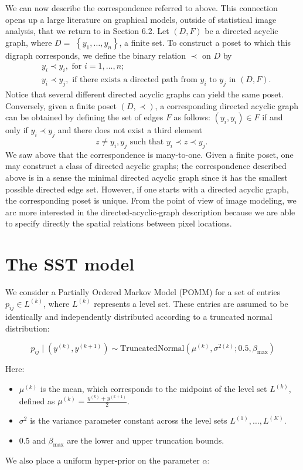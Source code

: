 \documentclass[11pt]{amsart}
\begin{document}
We can now describe the correspondence referred to above. This connection opens up a large literature on graphical models, outside of statistical image analysis, that we return to in Section 6.2. Let $(D, F)$ be a directed acyclic graph, where $D=$ $\left\{y_1, \ldots, y_n\right\}$, a finite set. To construct a poset to which this digraph corresponds, we define the binary relation $\prec$ on $D$ by
$$
\begin{aligned}
& y_i \prec y_i, \text { for } i=1, \ldots, n \text {; } \\
& y_i \prec y_j, \text { if there exists a directed path from } y_i \text { to } y_j \text { in }(D, F) .
\end{aligned}
$$
Notice that several different directed acyclic graphs can yield the same poset.
Conversely, given a finite poset $(D, \prec)$, a corresponding directed acyclic graph can be obtained by defining the set of edges $F$ as follows:
$\left(y_i, y_i\right) \in F$ if and only if $y_i \prec y_j$ and there does not exist a third element
$$
z \neq y_i, y_j \text { such that } y_i \prec z \prec y_j \text {. }
$$
We saw above that the correspondence is many-to-one. Given a finite poset, one may construct a class of directed acyclic graphs; the correspondence described above is in a sense the minimal directed acyclic graph since it has the smallest possible directed edge set. However, if one starts with a directed acyclic graph, the corresponding poset is unique. From the point of view of image modeling, we arc more interested in the directed-acyclic-graph description because we are able to specify directly the spatial relations between pixel locations.



\section{The SST model}


We consider a Partially Ordered Markov Model (POMM) for a set of entries $p_{ij} \in L^{(k)}$, where $L^{(k)}$ represents a level set. These entries are assumed to be identically and independently distributed according to a truncated normal distribution:

\[
p_{ij} \mid (y^{(k)}, y^{(k+1)}) \sim \text{TruncatedNormal}(\mu^{(k)}, \sigma^{2(k)}; 0.5, \beta_{\max})
\]

Here:
\begin{itemize}
\item $\mu^{(k)}$ is the mean, which corresponds to the midpoint of the level set $L^{(k)}$, defined as $\mu^{(k)} = \frac{y^{(k)}+y^{(k+1)}}{2}$.
\item $\sigma^{2}$ is the variance parameter constant across the level sets $L^{(1)},\ldots,L^{(K)}$.
\item $0.5$ and $\beta_{\max}$ are the lower and upper truncation bounds.
\end{itemize}
We also place a uniform hyper-prior on the parameter $\alpha$:
\end{document}
